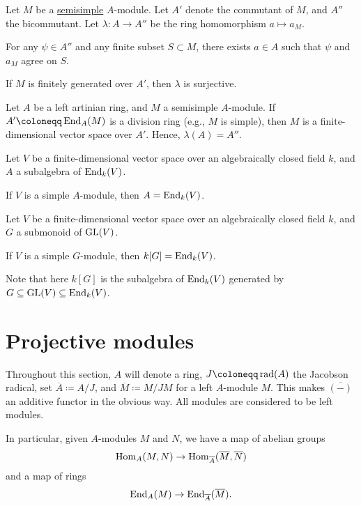 \documentclass[12pt]{article}
\begin{document}
\begin{thm} \label{thm:jacobson-density-theorem}
	Let $M$ be a \underline{semisimple} $A$-module. 
	Let $A'$ denote the commutant of $M$, and $A''$ the bicommutant. 
	Let $\lambda \colon A \to A''$ be the ring homomorphism $a \mapsto a_{M}$.

	For any $\psi \in A''$ and any finite subset $S \subset M$, 
	there exists $a \in A$ such that $\psi$ and $a_{M}$ agree on $S$.

	If $M$ is finitely generated over $A'$, then $\lambda$ is surjective.
\end{thm}
\begin{cor} \label{cor:left-artin-semisimple-commutant-division-ring}
	Let $A$ be a left artinian ring, and $M$ a semisimple $A$-module. 
	If $A' \coloneqq \End_{A}(M)$ is a division ring (e.g., $M$ is simple), 
	then $M$ is a finite-dimensional vector space over $A'$. 
	Hence, $\lambda(A) = A''$.
\end{cor}
\begin{cor}
	Let $V$ be a finite-dimensional vector space over an algebraically closed field $k$, 
	and $A$ a subalgebra of $\operatorname{End}_{k}(V)$. 

	If $V$ is a simple $A$-module, then $A = \operatorname{End}_{k}(V)$.
\end{cor}
\begin{cor}
	Let $V$ be a finite-dimensional vector space over an algebraically closed field $k$, 
	and $G$ a submonoid of $\operatorname{GL}(V)$. 

	If $V$ is a simple $G$-module, then $k[G] = \operatorname{End}_{k}(V)$.
\end{cor}
Note that here $k[G]$ is the subalgebra of $\operatorname{End}_{k}(V)$ generated by $G \subseteq \operatorname{GL}(V) \subseteq \operatorname{End}_{k}(V)$.

\section{Projective modules}

Throughout this section, 
$A$ will denote a ring, 
$J \coloneqq \rad(A)$ the Jacobson radical, 
set $\overline{A} \coloneqq A/J$, 
and $\overline{M} \coloneqq M/JM$ for a left $A$-module $M$. 
This makes $\overline{(-)}$ an additive functor in the obvious way. 
All modules are considered to be left modules. 

In particular, given $A$-modules $M$ and $N$, we have a map of abelian groups
\begin{equation*} 
	\operatorname{Hom}_{A}(M, N) \to \operatorname{Hom}_{\overline{A}}(\overline{M}, \overline{N})
\end{equation*}
and a map of rings
\begin{equation*} 
	\operatorname{End}_{A}(M) \to \operatorname{End}_{\overline{A}}(\overline{M}).
\end{equation*}
\end{document}
